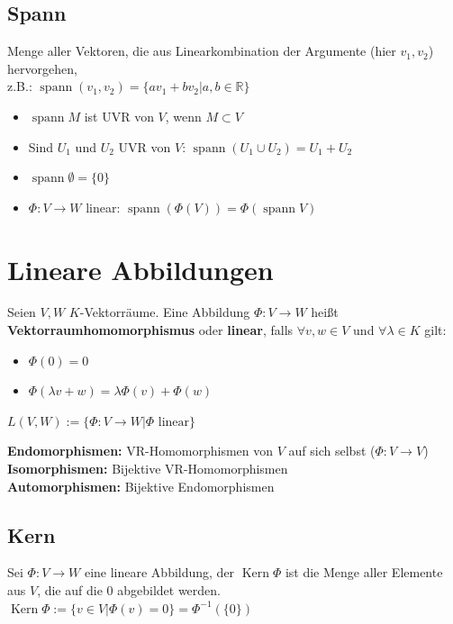 \documentclass[german, fourcolumn, 8pt]{latex4ei/latex4ei_sheet}
\DeclareMathOperator{\spann}{spann}
\DeclareMathOperator{\Kern}{Kern}
\begin{document}
\begin{sectionbox}
    \subsection{Spann}
    Menge aller Vektoren, die aus Linearkombination der Argumente (hier $v_1, v_2$) hervorgehen,\\
    z.B.: $\spann(v_1, v_2)=\{av_1 + bv_2 | a,b \in \mathbb{R}\}$
    \begin{itemize}
        \item $\spann M$ ist UVR von $V$, wenn $M \subset V$
        \item Sind $U_1$ und $U_2$ UVR von $V$: $\spann(U_1 \cup U_2) = U_1 + U_2$
        \item $\spann \emptyset = \{0\}$
        \item $\Phi : V \rightarrow W$ linear: $\spann(\Phi(V))=\Phi(\spann V)$
    \end{itemize}
\end{sectionbox}

\section{Lineare Abbildungen}
Seien $V,W$ $K$-Vektorräume. Eine Abbildung $\Phi:V\rightarrow W$ heißt \textbf{Vektorraumhomomorphismus} oder \textbf{linear}, falls $\forall v,w \in V$ und $\forall \lambda \in K$ gilt:
\begin{itemize}
    \item $\Phi(0)=0$
    \item $\Phi(\lambda v + w) = \lambda\Phi(v) + \Phi(w)$
\end{itemize}
$L(V,W):=\{\Phi: V \rightarrow W | \Phi \text{ linear} \}$

\begin{sectionbox}
    \textbf{Endomorphismen: }VR-Homomorphismen von $V$ auf sich selbst ($\Phi:V\rightarrow V$) \\
    \textbf{Isomorphismen: }Bijektive VR-Homomorphismen\\
    \textbf{Automorphismen: }Bijektive Endomorphismen\\
\end{sectionbox}

\begin{sectionbox}
    \subsection{Kern}
    Sei $\Phi : V \rightarrow W$ eine lineare Abbildung, der $\Kern \Phi$ ist die Menge aller Elemente aus $V$, die auf die $0$ abgebildet werden.\\
    $\Kern \Phi := \{v \in V | \Phi(v) = 0\}=\Phi^{-1}(\{0\})$
\end{sectionbox}
\end{document}
